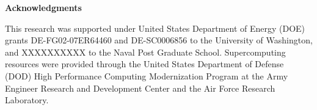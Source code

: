 \textbf{Acknowledgments}

This research was supported under United States Department of Energy (DOE) grants DE-FG02-07ER64460 and DE-SC0006856 to the University of Washington, and XXXXXXXXXX to the Naval Post Graduate School.
Supercomputing resources were provided through the United States Department of Defense (DOD) High Performance Computing Modernization Program at the Army Engineer Research and Development Center and the Air Force Research Laboratory.
  
  
  